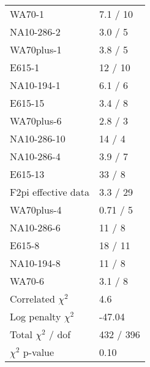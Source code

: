 \documentclass[14pt]{report}
\begin{document}
\begin{table}
\begin{center}
{\begin{tabular}{lp{2.57cm}}
  WA70-1 & 7.1 / 10  \\ 
  NA10-286-2 & 3.0 / 5  \\ 
  WA70plus-1 & 3.8 / 5  \\ 
  E615-1 & 12 / 10  \\ 
  NA10-194-1 & 6.1 / 6  \\ 
  E615-15 & 3.4 / 8  \\ 
  WA70plus-6 & 2.8 / 3  \\ 
  NA10-286-10 & 14 / 4  \\ 
  NA10-286-4 & 3.9 / 7  \\ 
  E615-13 & 33 / 8  \\ 
  F2pi effective data & 3.3 / 29  \\ 
  WA70plus-4 & 0.71 / 5  \\ 
  NA10-286-6 & 11 / 8  \\ 
  E615-8 & 18 / 11  \\ 
  NA10-194-8 & 11 / 8  \\ 
  WA70-6 & 3.1 / 8  \\ 
  Correlated $\chi^2$  & 4.6  \\ 
  Log penalty $\chi^2$  & -47.04  \\ 
  \rowcolor{white}
      \midrule
  Total $\chi^2$ / dof  & 432 / 396  \\ 
  \rowcolor{white}
      \midrule
  $\chi^2$ p-value  & 0.10   \\ 
      \bottomrule
    \end{tabular}
  }
  \end{center}
\end{table}
\end{document}
